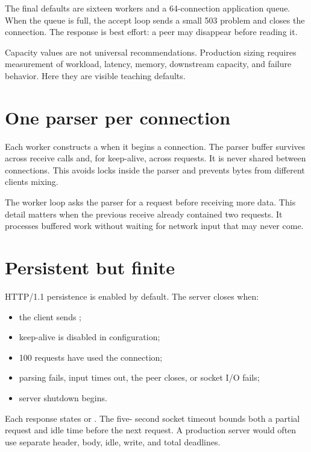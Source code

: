 The final defaults are sixteen workers and a 64-connection application queue.
When the queue is full, the accept loop sends a small 503 problem and closes the
connection. The response is best effort: a peer may disappear before reading it.

Capacity values are not universal recommendations. Production sizing requires
measurement of workload, latency, memory, downstream capacity, and failure
behavior. Here they are visible teaching defaults.

\section{One parser per connection}

Each worker constructs a  when it begins a connection. The
parser buffer survives across receive calls and, for keep-alive, across requests.
It is never shared between connections. This avoids locks inside the parser and
prevents bytes from different clients mixing.

The worker loop asks the parser for a request before receiving more data. This
detail matters when the previous receive already contained two requests. It
processes buffered work without waiting for network input that may never come.

\section{Persistent but finite}

HTTP/1.1 persistence is enabled by default. The server closes when:

\begin{itemize}
  \item the client sends ;
  \item keep-alive is disabled in configuration;
  \item 100 requests have used the connection;
  \item parsing fails, input times out, the peer closes, or socket I/O fails;
  \item server shutdown begins.
\end{itemize}

Each response states  or . The five-
second socket timeout bounds both a partial request and idle time before the next
request. A production server would often use separate header, body, idle, write,
and total deadlines.

